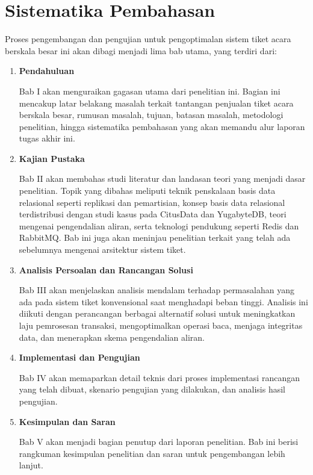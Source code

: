 \section{Sistematika Pembahasan}

Proses pengembangan dan pengujian untuk pengoptimalan sistem tiket acara berskala besar ini akan dibagi menjadi lima bab utama, yang terdiri dari:

\begin{enumerate}
      \item \textbf{Pendahuluan}

            Bab I akan menguraikan gagasan utama dari penelitian ini. Bagian ini mencakup latar belakang masalah terkait tantangan penjualan tiket acara berskala besar, rumusan masalah, tujuan, batasan masalah, metodologi penelitian, hingga sistematika pembahasan yang akan memandu alur laporan tugas akhir ini.

      \item \textbf{Kajian Pustaka}

            Bab II akan membahas studi literatur dan landasan teori yang menjadi dasar penelitian. Topik yang dibahas meliputi teknik penskalaan basis data relasional seperti replikasi dan pemartisian, konsep basis data relasional terdistribusi dengan studi kasus pada CitusData dan YugabyteDB, teori mengenai pengendalian aliran, serta teknologi pendukung seperti Redis dan RabbitMQ. Bab ini juga akan meninjau penelitian terkait yang telah ada sebelumnya mengenai arsitektur sistem tiket.

      \item \textbf{Analisis Persoalan dan Rancangan Solusi}

            Bab III akan menjelaskan analisis mendalam terhadap permasalahan yang ada pada sistem tiket konvensional saat menghadapi beban tinggi. Analisis ini diikuti dengan perancangan berbagai alternatif solusi untuk meningkatkan laju pemrosesan transaksi, mengoptimalkan operasi baca, menjaga integritas data, dan menerapkan skema pengendalian aliran.

      \item \textbf{Implementasi dan Pengujian}

            Bab IV akan memaparkan detail teknis dari proses implementasi rancangan yang telah dibuat, skenario pengujian yang dilakukan, dan analisis hasil pengujian.

      \item \textbf{Kesimpulan dan Saran}

            Bab V akan menjadi bagian penutup dari laporan penelitian. Bab ini berisi rangkuman kesimpulan penelitian dan saran untuk pengembangan lebih lanjut.

\end{enumerate}
